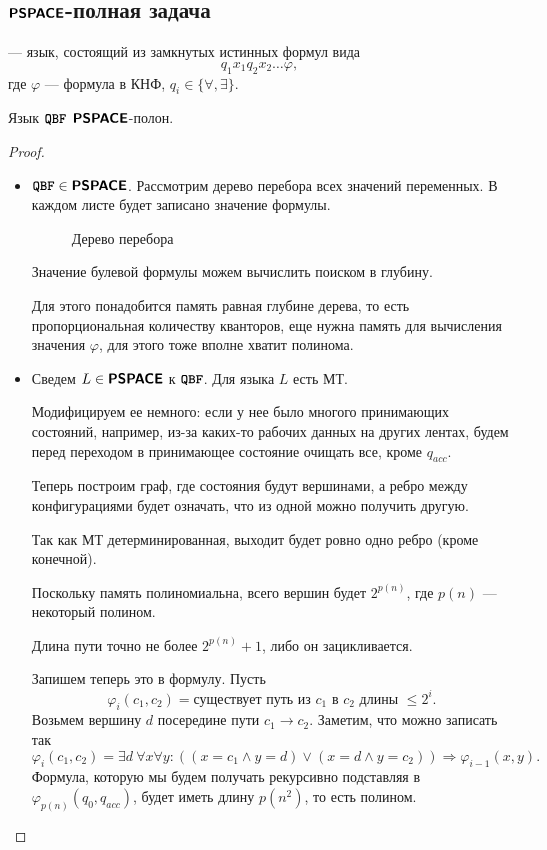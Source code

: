 \subsection{$ \textmd{\textbf{\textsf{PSPACE}}}$-полная задача}
\begin{defn}\index{ $ \QBF$ }
	 --- язык, состоящий из замкнутых истинных формул вида \[
	q_1 x_1 q_2 x_2 \ldots \varphi 
	,\]    
	где $ \varphi $ --- формула в КНФ, $ q_i \in \{ \forall , \exists \}$.
\end{defn}
\begin{thm}
	Язык $ \QBF$ $ \textmd{\textbf{\textsf{PSPACE}}} $-полон.
\end{thm}
\begin{proof}
	\begin{itemize}
		\item $ {{\textbf{\texttt{QBF}}}} \in \textmd{\textbf{\textsf{PSPACE}}}$. Рассмотрим дерево перебора всех значений переменных. В каждом листе будет записано значение формулы.
	\begin{figure}[ht]
		\centering
		\caption{Дерево перебора}
		\label{fig:qbf-tree}
	\end{figure}
	Значение булевой формулы можем вычислить поиском в глубину.
	
	Для этого понадобится память равная глубине дерева, то есть пропорциональная количеству кванторов, еще нужна память для вычисления значения $ \varphi $, для этого тоже вполне хватит полинома.
	
    \item Сведем $ L \in \textmd{\textbf{\textsf{PSPACE}}}$ к $ \QBF$. Для языка  $ L$ есть МТ. 
    
    Модифицируем ее немного: если у нее было многого принимающих состояний, например, из-за каких-то рабочих данных на других лентах, будем перед переходом в принимающее состояние очищать все, кроме $ q_{acc}$.

	Теперь построим граф, где состояния будут вершинами, а ребро между конфигурациями будет означать, что из одной можно получить другую.

	 Так как МТ детерминированная, выходит будет ровно одно ребро (кроме конечной).

	 Поскольку память полиномиальна, всего вершин будет $ 2^{p(n)}$, где $ p(n)$ --- некоторый полином.

	 Длина пути точно не более $ 2^{p(n)}+1$, либо он зацикливается.

	 Запишем теперь это в формулу.
	 Пусть
	 \[
		 \varphi_i (c_1, c_2) = \text{существует путь из } c_1 \text{ в } c_2 \text{ длины } \le 2^{i}
	 .\] 
	 Возьмем вершину $ d$ посередине пути $ c_1 \to c_2$. Заметим, что можно записать так
	 \[
		 \varphi_i(c_1, c_2) = \exists d  ~\forall x \forall y \colon   \left( (x = c_1 \wedge  y = d) \vee (x = d \wedge  y = c_2) \right)  \Longrightarrow \varphi _{i-1}(x, y)
	 .\] 
	 Формула, которую мы будем получать рекурсивно подставляя в $ \varphi _{p(n)}(q_0, q_{acc})$, будет иметь длину $ p(n^2)$, то есть полином.


\end{itemize}
\end{proof}
